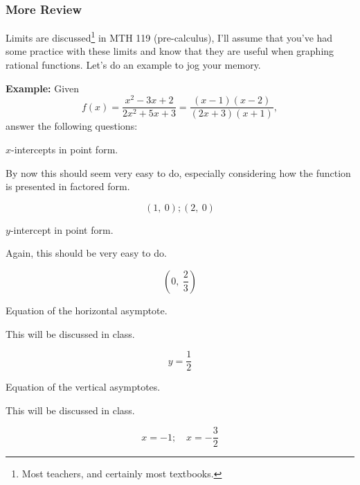 \documentclass[12pt,addpoints, answers, fleqn]{exam}
\begin{document}
\subsubsection{More Review}
Limits are discussed\footnote{Most teachers, and certainly most textbooks.} in MTH 119 (pre-calculus), I'll assume that you've had some practice with these limits and know that they are useful when graphing rational functions. Let's do an example to jog your memory.


\textbf{Example:} Given
\[
f \left( x \right) = \frac{x^2-3x+2}{2x^2+5x+3} = \frac{\left(x-1\right)\left(x-2\right)}{\left(2x+3\right)\left(x+1\right)},
\]
answer the following questions:

\begin{questions}
\question $x$-intercepts in point form.

\begin{solution}
By now this should seem very easy to do, especially considering how the function is presented in factored form.

\[
\left(1, \ 0 \right); \left(2, \ 0 \right)
\]
\end{solution}



\question $y$-intercept in point form.

\begin{solution}
Again, this should be very easy to do.

\[\left(0, \ \frac{2}{3} \right)
\]
\end{solution}



\question Equation of the horizontal asymptote.

\begin{solution}
This will be discussed in class.

\[
y = \frac{1}{2}
\]
\end{solution}



\question Equation of the vertical asymptotes.

\begin{solution}
This will be discussed in class.

\[
x = -1; \quad x = -\frac{3}{2}
\]
\end{solution}



\end{questions}
\end{document}
